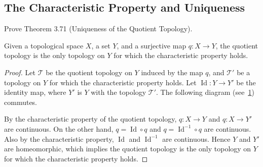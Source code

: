 \subsection*{The Characteristic Property and Uniqueness}

\begin{exercise}{3.72}
    Prove Theorem 3.71 (Uniqueness of the Quotient Topology).

    Given a topological space $X$, a set $Y$, and a surjective map $q: X \to Y$, the quotient topology is the only topology on $Y$ for which the characteristic property holds.
\end{exercise}

\begin{proof}
    Let $\mathscr{T}$ be the quotient topology on $Y$ induced by the map $q$, and $\mathscr{T}'$ be a topology on $Y$ for which the characteristic property holds. Let $\operatorname{Id}: Y\to Y'$ be the identity map, where $Y'$ is $Y$ with the topology $\mathscr{T}'$. The following diagram (see~\ref{fig:3.72}) commutes.
    \begin{figure}[htp]
        \renewcommand{\thefigure}{3.72}
        \centering
        \caption{}\label{fig:3.72}
    \end{figure}

    By the characteristic property of the quotient topology, $q: X\to Y$ and $q: X\to Y'$ are continuous. On the other hand, $q = \operatorname{Id}\circ q$ and $q = \operatorname{Id}^{-1}\circ q$ are continuous. Also by the characteristic property, $\operatorname{Id}$ and $\operatorname{Id}^{-1}$ are continuous. Hence $Y$ and $Y'$ are homeomorphic, which implies the quotient topology is the only topology on $Y$ for which the characteristic property holds.
\end{proof}

